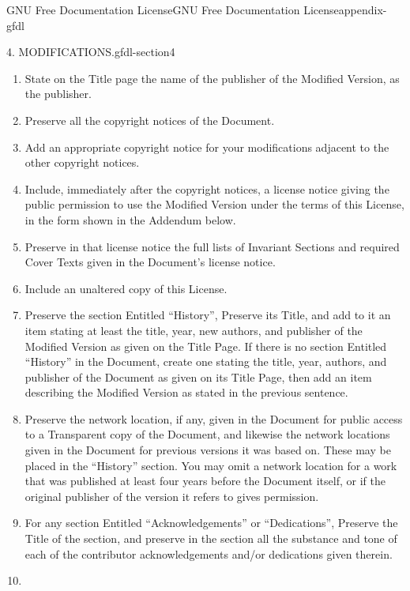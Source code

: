 \documentclass[oneside,10pt,]{book}
\numberwithin{equation}{section}
\begin{document}
\begin{appendixptx}{GNU Free Documentation License}{}{GNU Free Documentation License}{}{}{appendix-gfdl}
\begin{paragraphs}{4. MODIFICATIONS.}{gfdl-section4}
\begin{enumerate}[label=\Alph*.]
\item\hypertarget{li-149}{}\hypertarget{p-1581}{}%
State on the Title page the name of the publisher of the Modified Version, as the publisher.%
\item\hypertarget{li-150}{}\hypertarget{p-1582}{}%
Preserve all the copyright notices of the Document.%
\item\hypertarget{li-151}{}\hypertarget{p-1583}{}%
Add an appropriate copyright notice for your modifications adjacent to the other copyright notices.%
\item\hypertarget{li-152}{}\hypertarget{p-1584}{}%
Include, immediately after the copyright notices, a license notice giving the public permission to use the Modified Version under the terms of this License, in the form shown in the Addendum below.%
\item\hypertarget{li-153}{}\hypertarget{p-1585}{}%
Preserve in that license notice the full lists of Invariant Sections and required Cover Texts given in the Document's license notice.%
\item\hypertarget{li-154}{}\hypertarget{p-1586}{}%
Include an unaltered copy of this License.%
\item\hypertarget{li-155}{}\hypertarget{p-1587}{}%
Preserve the section Entitled ``History'', Preserve its Title, and add to it an item stating at least the title, year, new authors, and publisher of the Modified Version as given on the Title Page. If there is no section Entitled ``History'' in the Document, create one stating the title, year, authors, and publisher of the Document as given on its Title Page, then add an item describing the Modified Version as stated in the previous sentence.%
\item\hypertarget{li-156}{}\hypertarget{p-1588}{}%
Preserve the network location, if any, given in the Document for public access to a Transparent copy of the Document, and likewise the network locations given in the Document for previous versions it was based on.  These may be placed in the ``History'' section. You may omit a network location for a work that was published at least four years before the Document itself, or if the original publisher of the version it refers to gives permission.%
\item\hypertarget{li-157}{}\hypertarget{p-1589}{}%
For any section Entitled ``Acknowledgements'' or ``Dedications'', Preserve the Title of the section, and preserve in the section all the substance and tone of each of the contributor acknowledgements and\slash{}or dedications given therein.%
\item\hypertarget{li-158}{}\hypertarget{p-1590}{}%

\end{enumerate}
\end{paragraphs}
\end{appendixptx}
\end{document}
